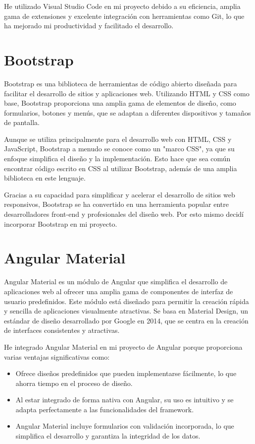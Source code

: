He utilizado Visual Studio Code en mi proyecto debido a su eficiencia, amplia gama de extensiones y excelente integración con herramientas como Git, lo que ha mejorado mi productividad y facilitado el desarrollo.


\section{Bootstrap}
Bootstrap \cite{bootstrap} es una biblioteca de herramientas de código abierto diseñada para facilitar el desarrollo de sitios y aplicaciones web. Utilizando HTML y CSS como base, Bootstrap proporciona una amplia gama de elementos de diseño, como formularios, botones y menús, que se adaptan a diferentes dispositivos y tamaños de pantalla.

Aunque se utiliza principalmente para el desarrollo web con HTML, CSS y JavaScript, Bootstrap a menudo se conoce como un "marco CSS", ya que su enfoque simplifica el diseño y la implementación. Esto hace que sea común encontrar código escrito en CSS al utilizar Bootstrap, además de una amplia biblioteca en este lenguaje.

Gracias a su capacidad para simplificar y acelerar el desarrollo de sitios web responsivos, Bootstrap se ha convertido en una herramienta popular entre desarrolladores front-end y profesionales del diseño web. Por esto mismo decidí incorporar Bootstrap en mi proyecto.

\hfill

\section{Angular Material}
Angular Material \cite{material} es un módulo de Angular que simplifica el desarrollo de aplicaciones web al ofrecer una amplia gama de componentes de interfaz de usuario predefinidos. Este módulo está diseñado para permitir la creación rápida y sencilla de aplicaciones visualmente atractivas. Se basa en Material Design, un estándar de diseño desarrollado por Google en 2014, que se centra en la creación de interfaces consistentes y atractivas.

He integrado Angular Material en mi proyecto de Angular porque proporciona varias ventajas significativas como:
\begin{itemize}
    \item
        Ofrece diseños predefinidos que pueden implementarse fácilmente, lo que ahorra tiempo en el proceso de diseño.
    \item 
        Al estar integrado de forma nativa con Angular, su uso es intuitivo y se adapta perfectamente a las funcionalidades del framework.
    \item 
        Angular Material incluye formularios con validación incorporada, lo que simplifica el desarrollo y garantiza la integridad de los datos.
\end{itemize}

